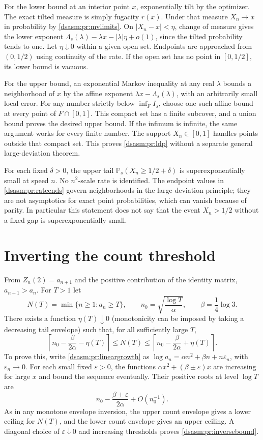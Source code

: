 \documentclass[11pt,letterpaper]{article}
\theoremstyle{remark}\newtheorem{remark}[theorem]{Remark}
\begin{document}
For the lower bound at an interior point $x$, exponentially tilt
by the optimizer. The exact tilted measure is simply fugacity $r(x)$.
Under that measure $X_n\to x$ in probability by \eqref{dsasm:pr:mvlimits}.
On $|X_n-x|<\eta$, change of measure gives the lower exponent
$\Lambda_s(\lambda)-\lambda x-|\lambda|\eta+o(1)$, since the tilted
probability tends to one. Let $\eta\downarrow0$ within a given open
set. Endpoints are approached from $(0,1/2)$ using continuity of the
rate. If the open set has no point in $[0,1/2]$, its lower bound is
vacuous.

For the upper bound, an exponential Markov inequality at any real
$\lambda$ bounds a neighborhood of $x$ by the affine exponent
$\lambda x-\Lambda_s(\lambda)$, with an arbitrarily small local error.
For any number strictly below $\inf_F I_s$, choose one such affine
bound at every point of $F\cap[0,1]$. This compact set has a finite
subcover, and a union bound proves the desired upper bound. If the
infimum is infinite, the same argument works for every finite number.
The support $X_n\in[0,1]$ handles points outside that compact set.
This proves \eqref{dsasm:pr:ldp} without a separate general large-deviation
theorem.

For each fixed $\delta>0$, the upper tail
$\mathbb P_s(X_n\ge1/2+\delta)$ is superexponentially small at speed
$n$. No $n^2$-scale rate is identified. The endpoint values in
\eqref{dsasm:pr:rateends} govern neighborhoods in the large-deviation
principle; they are not asymptotics for exact point probabilities,
which can vanish because of parity. In particular this statement
does not say that the event $X_n>1/2$ without a fixed gap is
superexponentially small.

\section{Inverting the count threshold}
\label{dsasm:pr:sec:inverse}
From $Z_n(2)=a_{n+1}$ and the positive contribution of the identity
matrix, $a_{n+1}>a_n$. For $T>1$ let
\[
 N(T)=\min\{n\ge1:a_n\ge T\},\qquad
 n_0=\sqrt{\frac{\log T}{\alpha}},\qquad \beta=\frac14\log3.
\]
There exists a function $\eta(T)\downarrow0$ (monotonicity can be
imposed by taking a decreasing tail envelope) such that, for all
sufficiently large $T$,
\begin{equation}\label{dsasm:pr:inversebound}
 \left\lceil n_0-\frac\beta{2\alpha}-\eta(T)\right\rceil
 \le N(T)\le
 \left\lceil n_0-\frac\beta{2\alpha}+\eta(T)\right\rceil.
\end{equation}
To prove this, write \eqref{dsasm:pr:lineargrowth} as
$\log a_n=\alpha n^2+\beta n+n\varepsilon_n$, with
$\varepsilon_n\to0$. For each small fixed $\varepsilon>0$, the
functions $\alpha x^2+(\beta\pm\varepsilon)x$ are increasing for
large $x$ and bound the sequence eventually. Their positive roots
at level $\log T$ are
\[
 n_0-\frac{\beta\pm\varepsilon}{2\alpha}+O(n_0^{-1}).
\]
As in any monotone envelope inversion, the upper count envelope
gives a lower ceiling for $N(T)$, and the lower count envelope gives
an upper ceiling. A diagonal choice of $\varepsilon\downarrow0$
and increasing thresholds proves \eqref{dsasm:pr:inversebound}.
\end{document}
